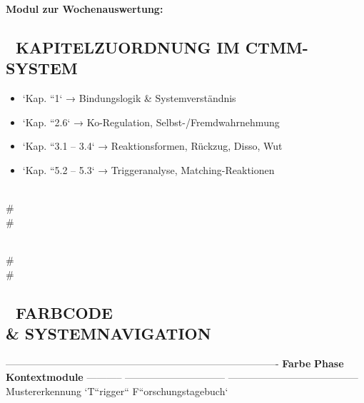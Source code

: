\textcolor{ctmmBlue}{} \textbf{Modul zur Wochenauswertung:}

\begin{itemize}
\item   \textbf{Trigger erkennen\textbf{
\end{itemize}

\begin{itemize}
\item   \textbf{Reaktionen vergleichen\textbf{
\end{itemize}

\begin{itemize}
\item   \textbf{Muster entschlüsseln -- aus beiden Perspektiven\textbf{
\end{itemize}

\subsection{📘 \textbf{KAPITELZUORDNUNG IM \textcolor{ctmmBlue}{CTMM}-SYSTEM}}

\begin{itemize}
\item   `Kap. ``1` → Bindungslogik \& Systemverständnis
\item   `Kap. ``2.6` → Ko-Regulation, Selbst-/Fremdwahrnehmung
\item   `Kap. ``3.1 -- 3.4` → Reaktionsformen, Rückzug, Disso, Wut
\item   `Kap. ``5.2 -- 5.3` → Triggeranalyse, Matching-Reaktionen
\end{itemize}

\\#\\#

\\#\\#

\subsection{\textbf{🎨 FARBCODE \\& SYSTEMNAVIGATION}}

----------------------------------------------------------------------------------
\textbf{Farbe}   \textbf{Phase}                      \textbf{Kontextmodule}
----------- ------------------------------ ---------------------------------------
🔵          Mustererkennung                `T``rigger`` F``orschungstagebuch`

